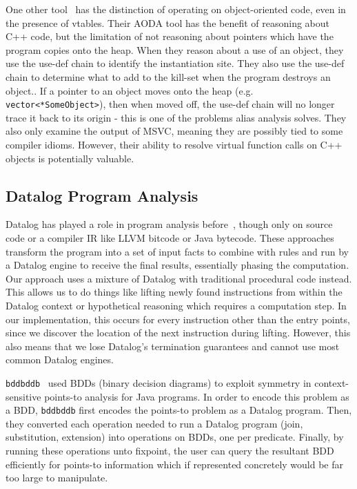 One other tool~\cite{dewey-uncovering-2015} has the distinction of operating on object-oriented code, even in the presence of vtables.
Their AODA tool has the benefit of reasoning about C++ code, but the limitation of not reasoning about pointers which have the program copies onto the heap.
When they reason about a use of an object, they use the use-def chain to identify the instantiation site.
They also use the use-def chain to determine what to add to the kill-set when the program destroys an object..
If a pointer to an object moves onto the heap (e.g. \texttt{vector<*SomeObject>}), then when moved off, the use-def chain will no longer trace it back to its origin - this is one of the problems alias analysis solves.
They also only examine the output of MSVC, meaning they are possibly tied to some compiler idioms.
However, their ability to resolve virtual function calls on C++ objects is potentially valuable.

\subsection{Datalog Program Analysis}
Datalog has played a role in program analysis before~\cite{bddbddb,doop1}, though only on source code or a compiler IR like LLVM bitcode or Java bytecode.
These approaches transform the program into a set of input facts to combine with rules and run by a Datalog engine to receive the final results, essentially phasing the computation.
Our approach uses a mixture of Datalog with traditional procedural code instead.
This allows us to do things like lifting newly found instructions from within the Datalog context or hypothetical reasoning which requires a computation step.
In our implementation, this occurs for every instruction other than the entry points, since we discover the location of the next instruction during lifting.
However, this also means that we lose Datalog's termination guarantees and cannot use most common Datalog engines.

\texttt{bddbddb}~\cite{bddbddb} used BDDs (binary decision diagrams) to exploit symmetry in context-sensitive points-to analysis for Java programs.
In order to encode this problem as a BDD, \texttt{bddbddb} first encodes the points-to problem as a Datalog program.
Then, they converted each operation needed to run a Datalog program (join, substitution, extension) into operations on BDDs, one per predicate.
Finally, by running these operations unto fixpoint, the user can query the resultant BDD efficiently for points-to information which if represented concretely would be far too large to manipulate.

